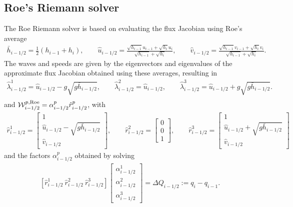 \documentclass[preprint, 11pt]{article}
\newcommand{\W}{{\mathcal W}}
\newcommand{\imh}{{i-1/2}}
\newcommand{\bfr}{{r}}
\newcommand{\Roe}{{\rm Roe}}
\begin{document}
\subsection{Roe's Riemann solver} \label{sec:roe}
The Roe Riemann solver is based on evaluating the flux Jacobian using Roe's average
\begin{align}\label{roe_average}
  \bar h_{i-1/2}=\frac{1}{2}(h_{i-1}+h_i), \qquad
  \hat u_{i-1/2}=\frac{\sqrt{h_{i-1}}u_{i-1}+\sqrt{h_i}u_i}{\sqrt{h_{i-1}}+\sqrt{h_i}}, \qquad
  \hat v_{i-1/2}=\frac{\sqrt{h_{i-1}}v_{i-1}+\sqrt{h_i}v_i}{\sqrt{h_{i-1}}+\sqrt{h_i}}.
\end{align}
The waves and speeds are given by the eigenvectors and eigenvalues of the approximate
flux Jacobian obtained using these averages, resulting in
\begin{align*}
  \hat\lambda_{i-1/2}^1=\hat u_{i-1/2}-g\sqrt{g\bar h_{i-1/2}}, \qquad
  \hat\lambda_{i-1/2}^2=\hat u_{i-1/2}, \qquad
  \hat\lambda_{i-1/2}^3=\hat u_{i-1/2}+g\sqrt{g\bar h_{i-1/2}}. \\
\end{align*}
and $\W_{i-1/2}^{p,\Roe}=\alpha_{i-1/2}^p\hat r_{i-1/2}^p$, with
\begin{align*}
  \hat \bfr^1_{i-1/2} =
  \begin{bmatrix}
    1 \\
    \hat u_{i-1/2}-\sqrt{g\bar h_{i-1/2}}\\
    \hat v_{i-1/2}
  \end{bmatrix},
  \qquad
  \hat \bfr^2_{i-1/2} =
  \begin{bmatrix}
    0\\
    0\\
    1
  \end{bmatrix},
  \qquad
  \hat \bfr^3_{i-1/2} =
  \begin{bmatrix}
    1 \\
    \hat u_{i-1/2}+\sqrt{g\bar h_{i-1/2}}\\
    \hat v_{i-1/2}
  \end{bmatrix}
\end{align*}
and the factors $\alpha^p_\imh$ obtained by solving
\begin{align}\label{system_for_alphas}
  \left[\hat \bfr^1_{i-1/2} ~\hat \bfr^2_{i-1/2} ~\hat \bfr^3_{i-1/2}\right]
  \begin{bmatrix}
    \alpha^1_{i-1/2} \\
    \alpha^2_{i-1/2} \\
    \alpha^3_{i-1/2}
  \end{bmatrix}
  =\Delta Q_{i-1/2}:=q_i-q_{i-1}.
\end{align}
\end{document}
